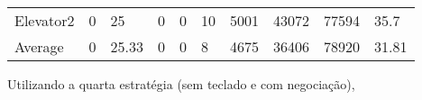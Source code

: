 \documentclass[a4paper]{article}
\begin{document}
\begin{table}[h]
\begin{tabular}{@{}llllllllll@{}}
Elevator2 & 0        & 25            & 0           & 0                                                               & 10                                                                  & 5001                                                         & 43072                                                 & 77594                                                   & 35.7         \\
Average   & 0     & 25.33         & 0        & 0                                                               & 8                                                               & 4675                                                         & 36406                                                 & 78920                                                   & 31.81          \\ \bottomrule
\end{tabular}
\end{table}

Utilizando a quarta estratégia (sem teclado e com negociação),
\end{document}
